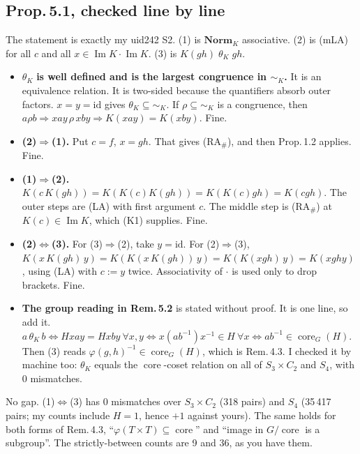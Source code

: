 \documentclass[11pt]{article}
\newcommand{\Norm}{\mathbf{Norm}}
\renewcommand{\Im}{\operatorname{Im}}
\newcommand{\core}{\operatorname{core}}
\begin{document}
\subsection*{Prop.\,5.1, checked line by line}
The statement is exactly my uid242 S2. (1) is $\Norm_K$ associative. (2) is (mLA) for all $c$ and all $x\in\Im K\cdot\Im K$.
(3) is $K(gh)\;\theta_K\;gh$.
\begin{itemize}[leftmargin=*]
\item $\theta_K$ \textbf{is well defined and is the largest congruence in ${\sim_K}$.} It is an equivalence relation. It is
  two-sided because the quantifiers absorb outer factors. $x=y=\mathrm{id}$ gives $\theta_K\subseteq{\sim_K}$. If $\rho\subseteq{\sim_K}$ is a
  congruence, then $a\rho b\Rightarrow xay\,\rho\,xby\Rightarrow K(xay)=K(xby)$. Fine.
\item \textbf{(2)$\Rightarrow$(1).} Put $c=f$, $x=gh$. That gives (RA$_\#$), and then Prop.\,1.2 applies. Fine.
\item \textbf{(1)$\Rightarrow$(2).} $K(c\,K(gh))=K(K(c)K(gh))=K(K(c)gh)=K(cgh)$. The outer steps are (LA) with first
  argument $c$. The middle step is (RA$_\#$) at $K(c)\in\Im K$, which (K1) supplies. Fine.
\item \textbf{(2)$\Leftrightarrow$(3).} For (3)$\Rightarrow$(2), take $y=\mathrm{id}$. For (2)$\Rightarrow$(3),
  $K(x\,K(gh)\,y)=K(K(x\,K(gh))\,y)=K(K(xgh)\,y)=K(xghy)$, using (LA) with $c:=y$ twice. Associativity of $\cdot$ is
  used only to drop brackets. Fine.
\item \textbf{The group reading in Rem.\,5.2} is stated without proof. It is one line, so add it.
  $a\,\theta_K\,b\iff H xay=Hxby\ \forall x,y\iff x(ab^{-1})x^{-1}\in H\ \forall x\iff ab^{-1}\in\core_G(H)$.
  Then (3) reads $\varphi(g,h)^{-1}\in\core_G(H)$, which is Rem.\,4.3. I checked it by machine too: $\theta_K$ equals the
  $\core$-coset relation on all of $S_3{\times}C_2$ and $S_4$, with 0 mismatches.
\end{itemize}
No gap. (1)$\Leftrightarrow$(3) has 0 mismatches over $S_3{\times}C_2$ (318 pairs) and $S_4$ (35\,417 pairs; my counts include
$H=1$, hence $+1$ against yours). The same holds for both forms of Rem.\,4.3, ``$\varphi(T{\times}T)\subseteq\core$'' and ``image in $G/\core$ is a
subgroup''. The strictly-between counts are 9 and 36, as you have them.
\end{document}
